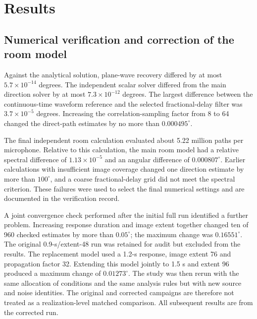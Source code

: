 \documentclass{edpsci}
\begin{document}
\section{Results}

\subsection{Numerical verification and correction of the room model}

Against the analytical solution, plane-wave recovery differed by at most $5.7\times10^{-14}$ degrees. The independent scalar solver differed from the main direction solver by at most $7.3\times10^{-12}$ degrees. The largest difference between the continuous-time waveform reference and the selected fractional-delay filter was $3.7\times10^{-5}$ degrees. Increasing the correlation-sampling factor from 8 to 64 changed the direct-path estimates by no more than $0.000495^\circ$.

The final independent room calculation evaluated about 5.22 million paths per microphone. Relative to this calculation, the main room model had a relative spectral difference of $1.13\times10^{-5}$ and an angular difference of $0.000807^\circ$. Earlier calculations with insufficient image coverage changed one direction estimate by more than $100^\circ$, and a coarse fractional-delay grid did not meet the spectral criterion. These failures were used to select the final numerical settings and are documented in the verification record.

A joint convergence check performed after the initial full run identified a further problem. Increasing response duration and image extent together changed ten of 960 checked estimates by more than $0.05^\circ$; the maximum change was $0.16551^\circ$. The original 0.9-s/extent-48 run was retained for audit but excluded from the results. The replacement model used a 1.2-s response, image extent 76 and propagation factor 32. Extending this model jointly to 1.5 s and extent 96 produced a maximum change of $0.01273^\circ$. The study was then rerun with the same allocation of conditions and the same analysis rules but with new source and noise identities. The original and corrected campaigns are therefore not treated as a realization-level matched comparison. All subsequent results are from the corrected run.
\end{document}
